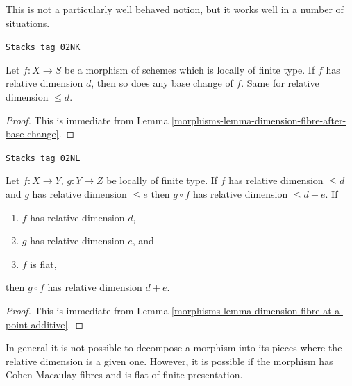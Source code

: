 This is not a particularly well behaved notion, but it works well
in a number of situations.

\begin{lemma}
\label{morphisms-lemma-base-change-relative-dimension-d}
\href{https://stacks.math.columbia.edu/tag/02NK}{\texttt{Stacks tag 02NK}}

Let $f : X \to S$ be a morphism of schemes which is locally of finite type.
If $f$ has relative dimension $d$, then so does any base change of $f$.
Same for relative dimension $\leq d$.
\end{lemma}

\begin{proof}

This is immediate from
Lemma \ref{morphisms-lemma-dimension-fibre-after-base-change}.
\end{proof}

\begin{lemma}
\label{morphisms-lemma-composition-relative-dimension-d}
\href{https://stacks.math.columbia.edu/tag/02NL}{\texttt{Stacks tag 02NL}}

Let $f : X \to Y$, $g : Y \to Z$ be locally of finite type.
If $f$ has relative dimension $\leq d$ and $g$ has relative dimension $\leq e$
then $g \circ f$ has relative dimension $\leq d + e$.
If
\begin{enumerate}
\item $f$ has relative dimension $d$,
\item $g$ has relative dimension $e$, and
\item $f$ is flat,
\end{enumerate}
then $g \circ f$ has relative dimension $d + e$.
\end{lemma}

\begin{proof}

This is immediate from Lemma \ref{morphisms-lemma-dimension-fibre-at-a-point-additive}.
\end{proof}

In general it is not possible to decompose a morphism
into its pieces where the relative dimension is a given
one. However, it is possible if the morphism has Cohen-Macaulay
fibres and is flat of finite presentation.

